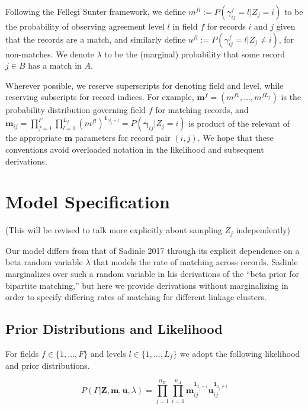 \documentclass[
  12pt,
]{article}
\begin{document}
Following the Fellegi Sunter framework, we define
\(m^{fl}:= P(\gamma_{ij}^f = l |Z_j = i)\) to be the probability of
observing agreement level \(l\) in field \(f\) for records \(i\) and
\(j\) given that the records are a match, and similarly define
\(u^{fl}:= P(\gamma_{ij}^f = l |Z_j \neq i)\), for non-matches. We
denote \(\lambda\) to be the (marginal) probability that some record
\(j \in B\) has a match in \(A\).

Wherever possible, we reserve superscripts for denoting field and level,
while reserving subscripts for record indices. For example,
\(\mathbf{m}^f = (m^{f1}, \ldots, m^{fL_f})\) is the probability
distribution governing field \(f\) for matching records, and
\(\mathbf{m}_{ij}= \prod_{f=1}^{F}\prod_{l=1}^{L_f} \left(m^{fl}\right)^{\mathbf{1}_{\gamma_{ij}^f = l}} = P(\boldsymbol{\gamma}_{ij}|Z_j = i)\)
is product of the relevant of the appropriate \(\mathbf{m}\) parameters
for record pair \((i,j)\). We hope that these conventions avoid
overloaded notation in the likelihood and subsequent derivations.

\hypertarget{model-specification}{%
\section{Model Specification}\label{model-specification}}

(This will be revised to talk more explicitly about sampling \(Z_j\)
independently)

Our model differs from that of Sadinle 2017 through its explicit
dependence on a beta random variable \(\lambda\) that models the rate of
matching across records. Sadinle marginalizes over such a random
variable in his derivations of the ``beta prior for bipartite
matching,'' but here we provide derivations without marginalizing in
order to specify differing rates of matching for different linkage
clusters.

\hypertarget{prior-distributions-and-likelihood}{%
\subsection{Prior Distributions and
Likelihood}\label{prior-distributions-and-likelihood}}

For fields \(f \in \{1, \ldots, F\}\) and levels
\(l\in \{1, \ldots, L_f\}\) we adopt the following likelihood and prior
distributions.

\[P(\Gamma|\mathbf{Z}, \mathbf{m}, \mathbf{u}, \lambda) =\prod_{j=1}^{n_B}  \prod_{i=1}^{n_A}\mathbf{m}_{ij}^{\mathbf{1}_{z_j = i}}\mathbf{u}_{ij}^{\mathbf{1}_{z_j \neq i}}\]
\end{document}
